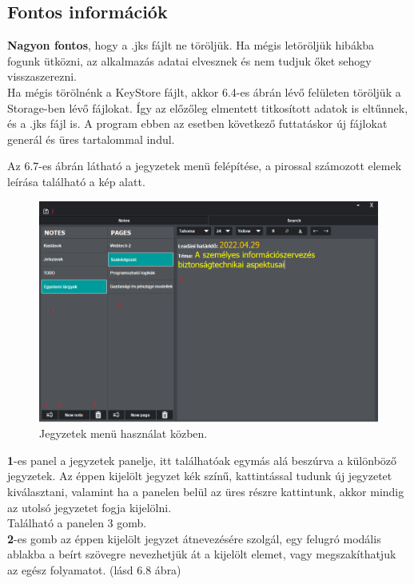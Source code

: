 \subsection{Fontos információk}
\textbf{Nagyon fontos}, hogy a .jks fájlt ne töröljük. Ha mégis letöröljük hibákba fogunk ütközni, az alkalmazás adatai elvesznek és nem tudjuk őket sehogy visszaszerezni.
\vspace{5pt}\\Ha mégis törölnénk a KeyStore fájlt, akkor 6.4-es ábrán lévő felületen töröljük a Storage-ben lévő fájlokat. Így az előzőleg elmentett titkosított adatok is eltűnnek, és a .jks fájl is. A program ebben az esetben következő futtatáskor új fájlokat generál és üres tartalommal indul.


\newpage{}

Az 6.7-es ábrán látható a jegyzetek menü felépítése, a pirossal számozott elemek leírása található a kép alatt.

\begin{figure}[h]
	\centering
	\includegraphics[scale=0.5]{images/doc_1.png}
	\caption{Jegyzetek menü használat közben.}
	\label{fig:menu_notes_2}
\end{figure}

\vspace{5pt} \noindent \textbf{1}-es panel a jegyzetek panelje, itt találhatóak egymás alá beszúrva a különböző jegyzetek. Az éppen kijelölt jegyzet kék színű, kattintással tudunk új jegyzetet kiválasztani, valamint ha a panelen belül az üres részre kattintunk, akkor mindig az utolsó jegyzetet fogja kijelölni.
\newline \\ Található a panelen 3 gomb. 
\vspace{5pt} \\ \textbf{2}-es gomb az éppen kijelölt jegyzet átnevezésére szolgál, egy felugró modális ablakba a beírt szövegre nevezhetjük át a kijelölt elemet, vagy megszakíthatjuk az egész folyamatot. (lásd 6.8 ábra)

